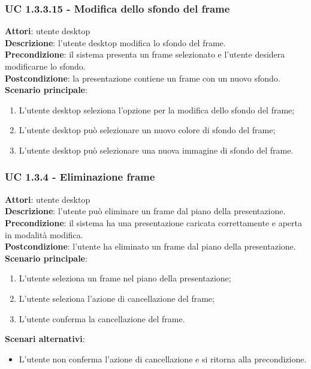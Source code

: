 \subsubsection{UC 1.3.3.15 - Modifica dello sfondo del frame}{
	\label{uc1.3.3.15}
	\textbf{Attori}: utente desktop \\
	\textbf{Descrizione}: l'utente desktop modifica lo sfondo del frame. \\
	\textbf{Precondizione}: il sistema presenta un frame selezionato e l'utente desidera modificarne lo sfondo.	\\
	\textbf{Postcondizione}: la presentazione contiene un frame con un nuovo sfondo.	\\
	\textbf{Scenario principale}:
	\begin{enumerate}
		\item L'utente desktop seleziona l'opzione per la modifica dello sfondo del frame;
		\item L'utente desktop può selezionare un nuovo colore di sfondo del frame;
		\item L'utente desktop può selezionare una nuova immagine di sfondo del frame.
	\end{enumerate}
	}
\subsubsection{UC 1.3.4 - Eliminazione frame}{
	\label{uc1.3.4}
	\textbf{Attori}: utente desktop \\
	\textbf{Descrizione}: l'utente può eliminare un frame dal piano della presentazione. \\
	\textbf{Precondizione}: il sistema ha una presentazione caricata correttamente e aperta in modalità modifica.	\\
	\textbf{Postcondizione}: l'utente ha eliminato un frame dal piano della presentazione.	\\
	\textbf{Scenario principale}:
	\begin{enumerate}
		\item L'utente seleziona un frame nel piano della presentazione;
		\item L'utente seleziona l'azione di cancellazione del frame;
		\item L'utente conferma la cancellazione del frame.
	\end{enumerate}
	\textbf{Scenari alternativi}: 
	\begin{itemize}
		\item L'utente non conferma l'azione di cancellazione e si ritorna alla precondizione.
	\end{itemize}
}
